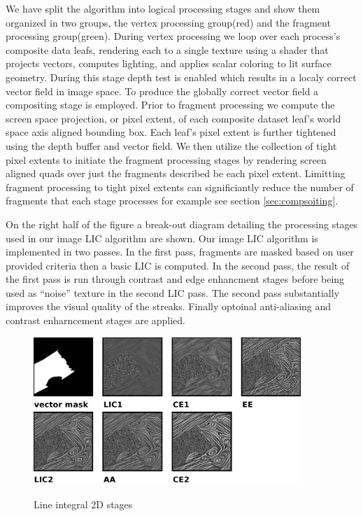\documentclass[a4paper,10pt]{article}
\begin{document}
We have split the algorithm into logical processing stages and show them organized in two groups, the vertex processing group(red) and the fragment processing  group(green). During vertex processing we loop over each process's composite data leafs, rendering each to a single texture using a shader that projects vectors, computes lighting, and applies scalar coloring to lit surface geometry. During this stage depth test is enabled which results in a localy correct vector field in image space. To produce the globally correct vector field a compositing stage is employed. Prior to fragment processing we compute the screen space projection, or pixel extent, of each composite dataset leaf's world space axis aligned bounding box. Each leaf's pixel extent is further tightened using the depth buffer and vector field. We then utilize the collection of tight pixel extents to initiate the fragment processing stages by rendering screen aligned quads over just the fragments described be each pixel extent. Limitting fragment processing to tight pixel extents can significiantly reduce the number of fragments that each stage processes for example see section \ref{sec:compsoiting}.

On the right half of the figure a break-out diagram detailing the processing stages used in our image LIC algorithm are shown. Our image LIC algorithm is implemented in two passes. In the first pass, fragments are masked based on user provided criteria\cite{surfacelic} then a basic LIC is computed\cite{imagelic}. In the second pass, the result of the first pass is run through contrast and edge enhancment stages before being used as ``noise'' texture in the second LIC pass. The second pass substantially improves the visual quality of the streaks.  Finally optoinal anti-aliasing and contrast enharncement stages are applied. 

\begin{figure}[ht]
	\centering
	\includegraphics[width=0.9\textwidth]{./images-data/dia-serial/lg-lic2d-200ppi.png}
	\label{fig:lic2d-outputs}
  \caption{Line integral 2D stages}
\end{figure}
\end{document}
